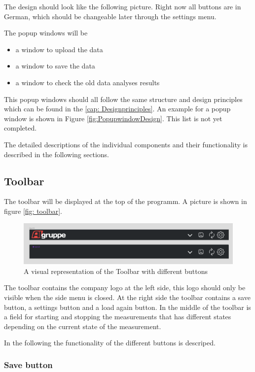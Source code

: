 \documentclass{scrreprt}
\begin{document}
The design should look like the following picture. Right now all buttons are in German, which should be changeable later through the settings menu. 

The popup windows will be 
\begin{itemize}
    \item a window to upload the data
    \item a window to save the data 
    \item a window to check the old data analyses results 
\end{itemize}

This popup windows should all follow the same structure and design principles which can be found in the \ref{cap: Designprinciples}. 
An example for a popup window is shown in Figure \ref{fig:PopupwindowDesign}.
This list is not yet completed. 

The detailed descriptions of the individual components and their functionality is described in the following sections.


\subsection{Toolbar}

The toolbar will be displayed at the top of the programm. 
A picture is shown in figure \ref{fig: toolbar}. 
\begin{figure}
    \includegraphics[width=.9\textwidth]{assets/pictures/Toolbar states.png}
    \caption[]{A visual representation of the Toolbar with different buttons}
    \label{fig:saveData}
\end{figure}
The toolbar contains the company logo at the left side, this logo should only be visible when the side menu is closed. 
At the right side the toolbar contains a save button, a settings button and a load again button. 
In the middle of the toolbar is a field for starting and stopping the measurements that has different states depending on the current state of the measurement. 

In the following the functionality of the different buttons is descriped. 

\subsubsection{Save button}
\end{document}
